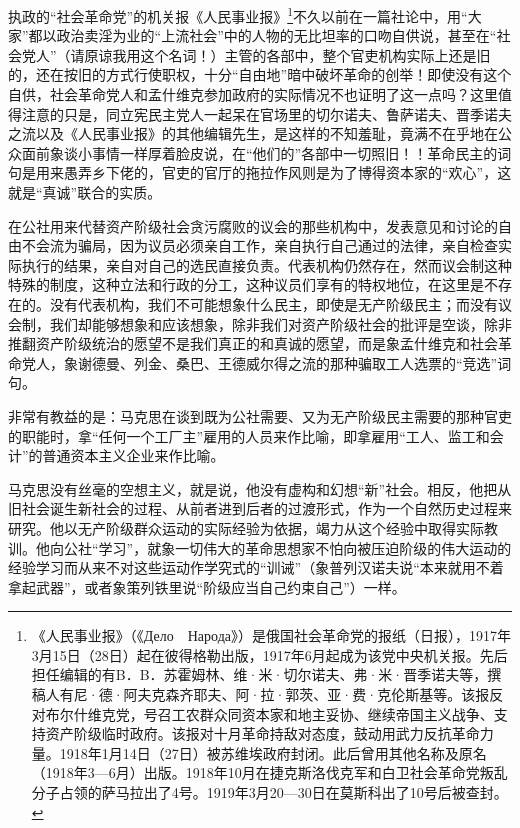 \documentclass[UTF8, 12pt, a4paper]{ctexrep}
\begin{document}
执政的“社会革命党”的机关报《人民事业报》\footnote{《人民事业报》（《Дело　Народа》）是俄国社会革命党的报纸（日报），1917年3月15日（28日）起在彼得格勒出版，1917年6月起成为该党中央机关报。先后担任编辑的有B．B．苏霍姆林、维·米·切尔诺夫、弗·米·晋季诺夫等，撰稿人有尼·德·阿夫克森齐耶夫、阿·拉·郭茨、亚·费·克伦斯基等。该报反对布尔什维克党，号召工农群众同资本家和地主妥协、继续帝国主义战争、支持资产阶级临时政府。该报对十月革命持敌对态度，鼓动用武力反抗革命力量。1918年1月14日（27日）被苏维埃政府封闭。此后曾用其他名称及原名（1918年3—6月）出版。1918年10月在捷克斯洛伐克军和白卫社会革命党叛乱分子占领的萨马拉出了4号。1919年3月20—30日在莫斯科出了10号后被查封。}不久以前在一篇社论中，用“大家”都以政治卖淫为业的“上流社会”中的人物的无比坦率的口吻自供说，甚至在“社会党人”（请原谅我用这个名词！）主管的各部中，整个官吏机构实际上还是旧的，还在按旧的方式行使职权，十分“自由地”暗中破坏革命的创举！即使没有这个自供，社会革命党人和孟什维克参加政府的实际情况不也证明了这一点吗？这里值得注意的只是，同立宪民主党人一起呆在官场里的切尔诺夫、鲁萨诺夫、晋季诺夫之流以及《人民事业报》的其他编辑先生，是这样的不知羞耻，竟满不在乎地在公众面前象谈小事情一样厚着脸皮说，在“他们的”各部中一切照旧！！革命民主的词句是用来愚弄乡下佬的，官吏的官厅的拖拉作风则是为了博得资本家的“欢心”，这就是“真诚”联合的实质。

在公社用来代替资产阶级社会贪污腐败的议会的那些机构中，发表意见和讨论的自由不会流为骗局，因为议员必须亲自工作，亲自执行自己通过的法律，亲自检查实际执行的结果，亲自对自己的选民直接负责。代表机构仍然存在，然而议会制这种特殊的制度，这种立法和行政的分工，这种议员们享有的特权地位，在这里是不存在的。没有代表机构，我们不可能想象什么民主，即使是无产阶级民主；而没有议会制，我们却能够想象和应该想象，除非我们对资产阶级社会的批评是空谈，除非推翻资产阶级统治的愿望不是我们真正的和真诚的愿望，而是象孟什维克和社会革命党人，象谢德曼、列金、桑巴、王德威尔得之流的那种骗取工人选票的“竞选”词句。

非常有教益的是：马克思在谈到既为公社需要、又为无产阶级民主需要的那种官吏的职能时，拿“任何一个工厂主”雇用的人员来作比喻，即拿雇用“工人、监工和会计”的普通资本主义企业来作比喻。

马克思没有丝毫的空想主义，就是说，他没有虚构和幻想“新”社会。相反，他把从旧社会诞生新社会的过程、从前者进到后者的过渡形式，作为一个自然历史过程来研究。他以无产阶级群众运动的实际经验为依据，竭力从这个经验中取得实际教训。他向公社“学习”，就象一切伟大的革命思想家不怕向被压迫阶级的伟大运动的经验学习而从来不对这些运动作学究式的“训诫”（象普列汉诺夫说“本来就用不着拿起武器”，或者象策列铁里说“阶级应当自己约束自己”）一样。
\end{document}
